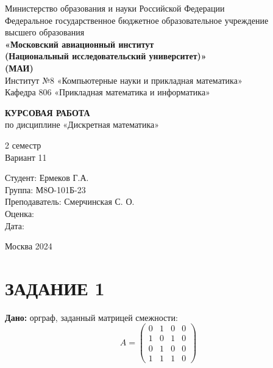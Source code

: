 \documentclass[14pt]{extarticle}
\begin{document}
\begin{center}
Министерство образования и науки Российской Федерации\\
Федеральное государственное бюджетное образовательное учреждение\\
высшего образования\\
\textbf{«Московский авиационный институт\\
(Национальный исследовательский университет)»\\
(МАИ)}\\
Институт №8 «Компьютерные науки и прикладная математика»\\
Кафедра 806 «Прикладная математика и информатика»
\end{center}

\vspace{4cm}

\begin{center}
\textbf{КУРСОВАЯ РАБОТА}\\
по дисциплине «Дискретная математика»\\
\end{center}

\begin{center}
2 семестр\\
Вариант 11\\
\end{center}

\vspace{2cm}

\begin{flushright}
Студент: Ермеков Г.А.\\
Группа: М8О-101Б-23\\
Преподаватель: Смерчинская С. О.\\
Оценка: \underline{\hspace{3cm}}\\
Дата: \underline{\hspace{3cm}}
\end{flushright}

\vfill

\begin{center}
Москва 2024
\end{center}

\newpage

\section*{\centering ЗАДАНИЕ 1}

\textbf{Дано:} орграф, заданный матрицей смежности:
\[
A = \begin{pmatrix}
0 & 1 & 0 & 0 \\
1 & 0 & 1 & 0 \\
0 & 1 & 0 & 0 \\
1 & 1 & 1 & 0
\end{pmatrix}
\]
\end{document}
